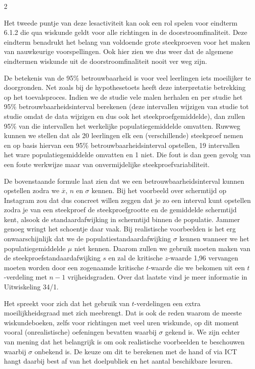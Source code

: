 \begin{multicols}{2}

Het tweede puntje van deze lesactiviteit kan ook een rol spelen voor eindterm 6.1.2 die qua wiskunde geldt voor alle richtingen in de doorstroomfinaliteit. Deze eindterm benadrukt het belang van voldoende grote steekproeven voor het maken van nauwkeurige voorspellingen. Ook hier zien we dus weer dat de algemene eindtermen wiskunde uit de doorstroomfinaliteit nooit ver weg zijn.

 De betekenis van de 95\% betrouwbaarheid is voor veel leerlingen iets moeilijker te doorgronden. Net zoals bij de hypothesetoets heeft deze interpretatie betrekking op het toevalsproces. Indien we de studie vele malen herhalen en per studie het 95\% betrouwbaarheidsinterval berekenen (deze intervallen wijzigen van studie tot studie omdat de data wijzigen en dus ook het steekproefgemiddelde), dan zullen 95\% van die intervallen het werkelijke populatiegemiddelde omvatten. Ruwweg kunnen we stellen dat als 20 leerlingen elk een (verschillende) steekproef nemen en op basis hiervan een 95\% betrouwbaarheidsinterval opstellen, 19 intervallen het ware populatiegemiddelde omvatten en 1 niet. Die fout is dan geen gevolg van een foute werkwijze maar van onvermijdelijke steekproefvariabiliteit.

De bovenstaande formule laat zien dat we een betrouwbaarheidsinterval kunnen opstellen zodra we $\overline{x}$, $n$ en $\sigma$ kennen. Bij het voorbeeld over schermtijd op Instagram zou dat dus concreet willen zeggen dat je zo een interval kunt opstellen zodra je van een steekproef de steekproefgrootte en de gemiddelde schermtijd kent, alsook de standaardafwijking in schermtijd binnen de populatie. Jammer genoeg wringt het schoentje daar vaak. Bij realistische voorbeelden is het erg onwaarschijnlijk dat we de populatiestandaardafwijking $\sigma$ kennen wanneer we het populatiegemiddelde $\mu$ niet kennen. Daarom zullen we gebruik moeten maken van de steekproefstandaardafwijking $s$ en zal de kritische $z$-waarde 1,96 vervangen moeten worden door een zogenaamde kritische $t$-waarde die we bekomen uit een $t$-verdeling met $n-1$ vrijheidsgraden. Over dat laatste vind je meer informatie in Uitwiskeling 34/1. 

Het spreekt voor zich dat het gebruik van $t$-verdelingen een extra moeilijkheidsgraad met zich meebrengt. Dat is ook de reden waarom de meeste wiskundeboeken, zelfs voor richtingen met veel uren wiskunde, op dit moment vooral (onrealistische) oefeningen bevatten waarbij $\sigma$ gekend is. We zijn echter van mening dat het belangrijk is om ook realistische voorbeelden te beschouwen waarbij $\sigma$ onbekend is. De keuze om dit te berekenen met de hand of via ICT hangt daarbij best af van het doelpubliek en het aantal beschikbare lesuren.


\end{multicols}

